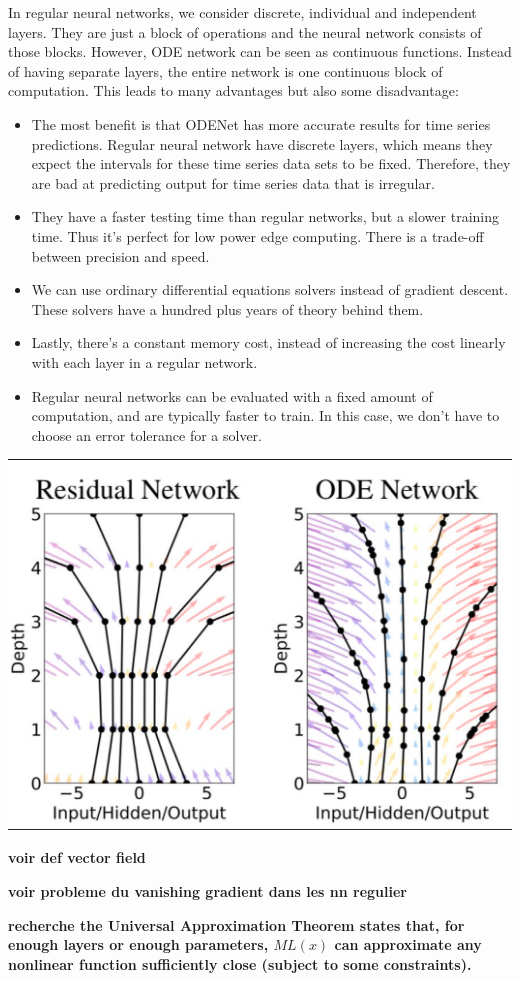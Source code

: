 \documentclass[10pt,a4paper]{article}
\theoremstyle{definition}
\theoremstyle{definition}
\begin{document}
In regular neural networks, we consider discrete, individual and independent layers. They are just a block of operations and the neural network consists of those blocks. However, ODE network can be seen as continuous functions. Instead of having separate layers, the entire network is one continuous block of computation. This leads to many advantages but also some disadvantage:
\begin{itemize}
\item The most benefit is that ODENet has more accurate results for time series predictions. Regular neural network have discrete layers, which means they expect the intervals for these time series data sets to be fixed. Therefore, they are bad at predicting output for time series data that is irregular.
\item They have a faster testing time than regular networks, but a slower training time. Thus it's perfect for low power edge computing. There is a trade-off between precision and speed.
\item We can use ordinary differential equations solvers instead of gradient descent. These solvers have a hundred plus years of theory behind them.
\item Lastly, there's a constant memory cost, instead of increasing the cost linearly with each layer in a regular network.
\item Regular neural networks can be evaluated with a fixed amount of computation, and are typically faster to train. In this case, we don't have to choose an error tolerance for a solver.
\end{itemize}




\begin{center}
\includegraphics[scale=0.7]{resnetvsodenet.png}
\end{center}

\textbf{voir def vector field}

\textbf{voir probleme du vanishing gradient dans les nn regulier}

\textbf{ recherche the Universal Approximation Theorem states that, for enough layers or enough parameters, $ML(x)$ can approximate any nonlinear function sufficiently close (subject to some constraints).}
\end{document}
